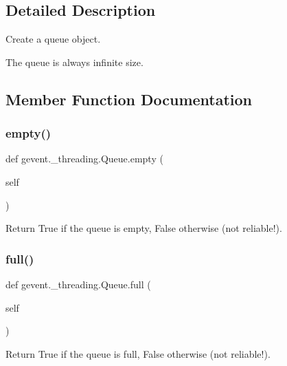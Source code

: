 \subsection{Detailed Description}
\begin{DoxyVerb}Create a queue object.

The queue is always infinite size.
\end{DoxyVerb}
 

\subsection{Member Function Documentation}
\mbox{\label{classgevent_1_1__threading_1_1_queue_a0562fa76a39f3e5746fe9105031bca66}} 
\subsubsection{\texorpdfstring{empty()}{empty()}}
{\footnotesize\ttfamily def gevent.\+\_\+threading.\+Queue.\+empty (\begin{DoxyParamCaption}\item[{}]{self }\end{DoxyParamCaption})}

\begin{DoxyVerb}Return True if the queue is empty, False otherwise (not reliable!).\end{DoxyVerb}
 \mbox{\label{classgevent_1_1__threading_1_1_queue_a6061d745b1d271818d7aa2dbb17b6c0f}} 
\subsubsection{\texorpdfstring{full()}{full()}}
{\footnotesize\ttfamily def gevent.\+\_\+threading.\+Queue.\+full (\begin{DoxyParamCaption}\item[{}]{self }\end{DoxyParamCaption})}

\begin{DoxyVerb}Return True if the queue is full, False otherwise (not reliable!).\end{DoxyVerb}
 \mbox{\label{classgevent_1_1__threading_1_1_queue_a95b0b413654f9fa7a435f2ef20a5199b}} 
